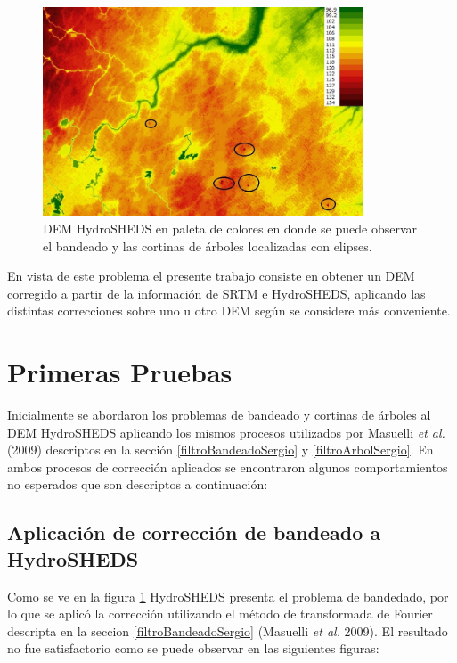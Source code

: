 \documentclass[10pt,a4paper, twoside]{report}
\begin{document}
\begin{figure}[!htb]
   \centering      
   \includegraphics[width=0.85\textwidth]{imagenes/HSHEDSPaleta.jpg}
 \caption{DEM HydroSHEDS en paleta de colores en donde se puede observar el bandeado y las cortinas de árboles localizadas con elipses.}
 \label{HSHEDSPaleta}
\end{figure}


En vista de este problema el presente trabajo consiste en obtener un DEM corregido a partir de la información de SRTM e HydroSHEDS, aplicando las distintas correcciones sobre uno u otro DEM según se considere más conveniente.

\section{Primeras Pruebas}

Inicialmente se abordaron los problemas de bandeado y cortinas de árboles al DEM HydroSHEDS aplicando los mismos procesos utilizados por Masuelli \textit{et al.} (2009) descriptos en la sección \ref{filtroBandeadoSergio} y \ref{filtroArbolSergio}. En ambos procesos de corrección aplicados se encontraron algunos comportamientos no esperados que son descriptos a continuación:

\subsection{Aplicación de corrección de bandeado a HydroSHEDS}
\label{aplicacionBandeado}

Como se ve en la figura \ref{HSHEDSPaleta} HydroSHEDS presenta el problema de bandedado, por lo que se aplicó la corrección utilizando el método de transformada de Fourier descripta en la seccion \ref{filtroBandeadoSergio} (Masuelli \textit{et al.} 2009). El resultado no fue satisfactorio como se puede observar en las siguientes figuras:
\end{document}
